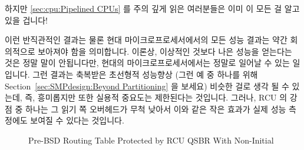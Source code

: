 {{	\fi

	하지만
	\cref{sec:cpu:Pipelined CPUs}
	를 주의 깊게 읽은 여러분들은 이미 이 모든 걸 알고 있을 겁니다!

	이런 반직관적인 결과는 물론 현대 마이크로프로세서에서의 모든 성능
	결과는 약간 회의적으로 보아져야 함을 의미합니다.
	이론상, 이상적인 것보다 나은 성능을 얻는다는 것은 정말 말이 안됩니다만,
	현대의 마이크로프로세서에서는 정말로 일어날 수 있는 일입니다.
	그런 결과는 축복받은 초선형적 성능향상 (그런 예 중 하나를 위해
	Section~\ref{sec:SMPdesign:Beyond Partitioning} 을 보세요) 비슷한 걸로
	생각 될 수 있는데, 즉, 흥미롭지만 또한 실용적 중요도는 제한된다는
	것입니다.
	그러나, RCU 의 강점 중 하나는 그 읽기 쪽 오버헤드가 무척 낮아서 이와
	같은 작은 효과가 실제 성능 측정에도 보여질 수 있다는 것입니다.

\begin{figure}[tb]
\centering
{}
\caption{Pre-BSD Routing Table Protected by RCU QSBR With Non-Initial }
\label{fig:defer:Pre-BSD Routing Table Protected by RCU QSBR With Non-Initial rcu-head}
\end{figure}

}}
